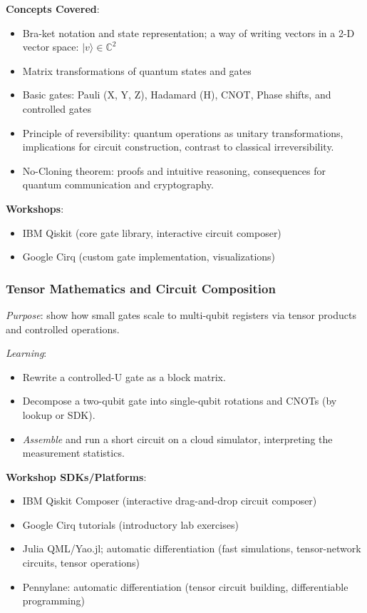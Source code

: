 \textbf{Concepts Covered}:
\begin{itemize}
	\item Bra-ket notation and state representation; a way of writing vectors in a 2-D vector space: $|v \rangle \in \mathbb{C}^2$
	\item Matrix transformations of quantum states and gates
	\item Basic gates: Pauli (X, Y, Z), Hadamard (H), CNOT, Phase shifts, and controlled gates
	\item Principle of reversibility: quantum operations as unitary transformations, implications for circuit construction, contrast to classical irreversibility.
	\item No-Cloning theorem: proofs and intuitive reasoning, consequences for quantum communication and cryptography.
\end{itemize}


\textbf{Workshops}:
\begin{itemize}	
	\item IBM Qiskit (core gate library, interactive circuit composer)
	\item Google Cirq (custom gate implementation, visualizations)
\end{itemize}

\subsubsection*{Tensor Mathematics and Circuit Composition}

\emph{Purpose}: show how small gates scale to multi-qubit registers via tensor products and controlled operations.

\emph{Learning}:
\begin{itemize}
	\item Rewrite a controlled-U gate as a block matrix.
	\item Decompose a two-qubit gate into single-qubit rotations and CNOTs (by lookup or SDK).
	\item \emph{Assemble} and run a short circuit on a cloud simulator, interpreting the measurement statistics.
\end{itemize}

\textbf{Workshop SDKs/Platforms}:
\begin{itemize}
	\item IBM Qiskit Composer (interactive drag-and-drop circuit composer)
	\item Google Cirq tutorials (introductory lab exercises)
	\item Julia QML/Yao.jl; automatic differentiation (fast simulations, tensor-network circuits, tensor operations)
	\item Pennylane: automatic differentiation  (tensor circuit building, differentiable programming)
\end{itemize}

